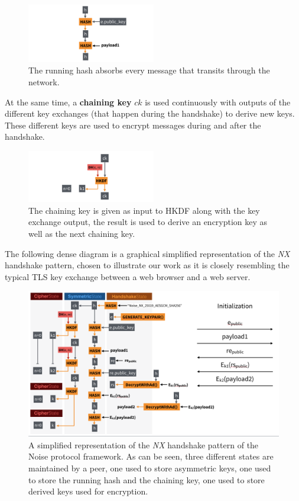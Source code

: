 \documentclass{article}
\begin{document}
\begin{figure}[H]
\centering
\includegraphics[width=0.5\textwidth]{rwcimg/h.png}
\caption{The running hash absorbs every message that transits through the network.}
\end{figure}

At the same time, a \textbf{chaining key} $ck$ is used continuously with outputs of the different key exchanges (that happen during the handshake) to derive new keys. These different keys are used to encrypt messages during and after the handshake.

\begin{figure}[H]
\centering
\includegraphics[width=0.5\textwidth]{rwcimg/ck.png}
\caption{The chaining key is given as input to HKDF along with the key exchange output, the result is used to derive an encryption key as well as the next chaining key.}
\end{figure}

The following dense diagram is a graphical simplified representation of the \emph{NX} handshake pattern, chosen to illustrate our work as it is closely resembling the typical TLS key exchange between a web browser and a web server.

\begin{figure}[H]
\centering
\includegraphics[width=\textwidth]{rwcimg/noise_nx.png}
\caption{A simplified representation of the \emph{NX} handshake pattern of the Noise protocol framework. As can be seen, three different states are maintained by a peer, one used to store asymmetric keys, one used to store the running hash and the chaining key, one used to store derived keys used for encryption.}
\label{fig:noise_nx}
\end{figure}
\end{document}
